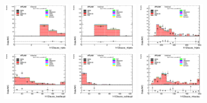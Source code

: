\begin{figure}[htbp]
\centering
\begin{center}
  \includegraphics[width=0.3\textwidth, keepaspectratio]{fig/OneLepTwoTaus/Plots_Plots_njets_ssdata_signal.pdf}
  \includegraphics[width=0.3\textwidth, keepaspectratio]{fig/OneLepTwoTaus/Plots_Plots_nbjets_ssdata_signal.pdf}
  \includegraphics[width=0.3\textwidth, keepaspectratio]{fig/OneLepTwoTaus/Plots_Plots_htjets_ssdata_signal.pdf}
  \includegraphics[width=0.3\textwidth, keepaspectratio]{fig/OneLepTwoTaus/Plots_Plots_leadtaupt_ssdata_signal.pdf}
  \includegraphics[width=0.3\textwidth, keepaspectratio]{fig/OneLepTwoTaus/Plots_Plots_subtaupt_ssdata_signal.pdf}
  \includegraphics[width=0.3\textwidth, keepaspectratio]{fig/OneLepTwoTaus/Plots_Plots_mtautau_ssdata_signal.pdf}

\end{center}
\end{figure}
